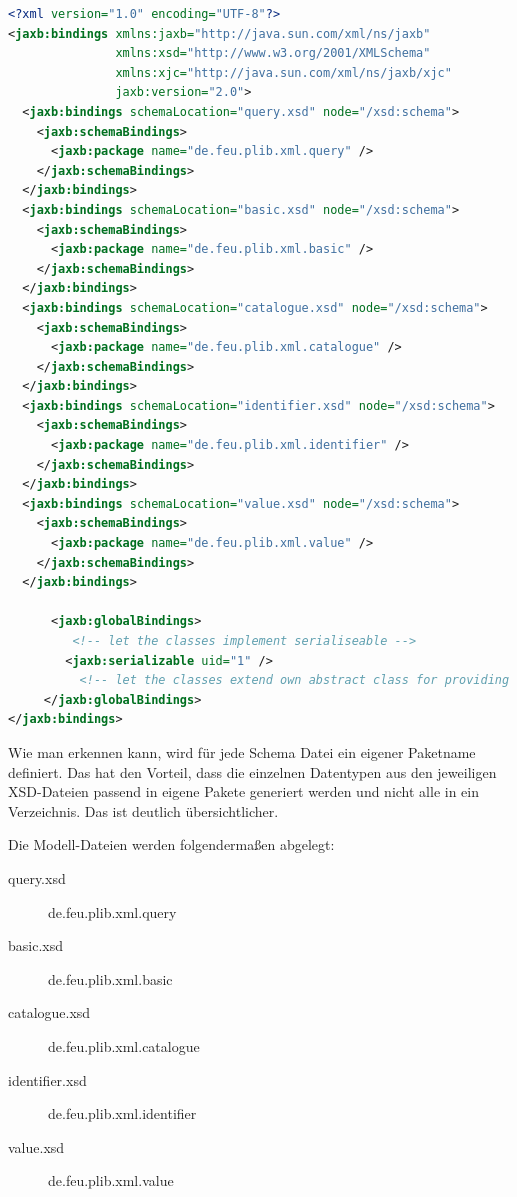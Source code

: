 \begin{lstlisting}[caption=Binding File binding.xjc, language=XML, label=lst:bindingfile]
<?xml version="1.0" encoding="UTF-8"?>
<jaxb:bindings xmlns:jaxb="http://java.sun.com/xml/ns/jaxb"
               xmlns:xsd="http://www.w3.org/2001/XMLSchema"
               xmlns:xjc="http://java.sun.com/xml/ns/jaxb/xjc"
               jaxb:version="2.0">
  <jaxb:bindings schemaLocation="query.xsd" node="/xsd:schema">
    <jaxb:schemaBindings>
      <jaxb:package name="de.feu.plib.xml.query" />
    </jaxb:schemaBindings>
  </jaxb:bindings>
  <jaxb:bindings schemaLocation="basic.xsd" node="/xsd:schema">
    <jaxb:schemaBindings>
      <jaxb:package name="de.feu.plib.xml.basic" />
    </jaxb:schemaBindings>
  </jaxb:bindings>
  <jaxb:bindings schemaLocation="catalogue.xsd" node="/xsd:schema">
    <jaxb:schemaBindings>
      <jaxb:package name="de.feu.plib.xml.catalogue" />
    </jaxb:schemaBindings>
  </jaxb:bindings>
  <jaxb:bindings schemaLocation="identifier.xsd" node="/xsd:schema">
    <jaxb:schemaBindings>
      <jaxb:package name="de.feu.plib.xml.identifier" />
    </jaxb:schemaBindings>
  </jaxb:bindings>
  <jaxb:bindings schemaLocation="value.xsd" node="/xsd:schema">
    <jaxb:schemaBindings>
      <jaxb:package name="de.feu.plib.xml.value" />
    </jaxb:schemaBindings>
  </jaxb:bindings> 
  
      <jaxb:globalBindings>
         <!-- let the classes implement serialiseable -->
        <jaxb:serializable uid="1" />
          <!-- let the classes extend own abstract class for providing some extra functionality for each one -->
     </jaxb:globalBindings>  
</jaxb:bindings> 
\end{lstlisting}

Wie man erkennen kann, wird für jede Schema Datei ein eigener Paketname definiert. Das hat den Vorteil, dass die einzelnen Datentypen aus den jeweiligen XSD-Dateien passend in eigene Pakete generiert werden und nicht alle in ein Verzeichnis. Das ist deutlich übersichtlicher. 

Die Modell-Dateien werden folgendermaßen abgelegt:

\begin{description}
\item[query.xsd] de.feu.plib.xml.query
\item[basic.xsd] de.feu.plib.xml.basic
\item[catalogue.xsd] de.feu.plib.xml.catalogue
\item[identifier.xsd] de.feu.plib.xml.identifier
\item[value.xsd] de.feu.plib.xml.value
\end{description}

